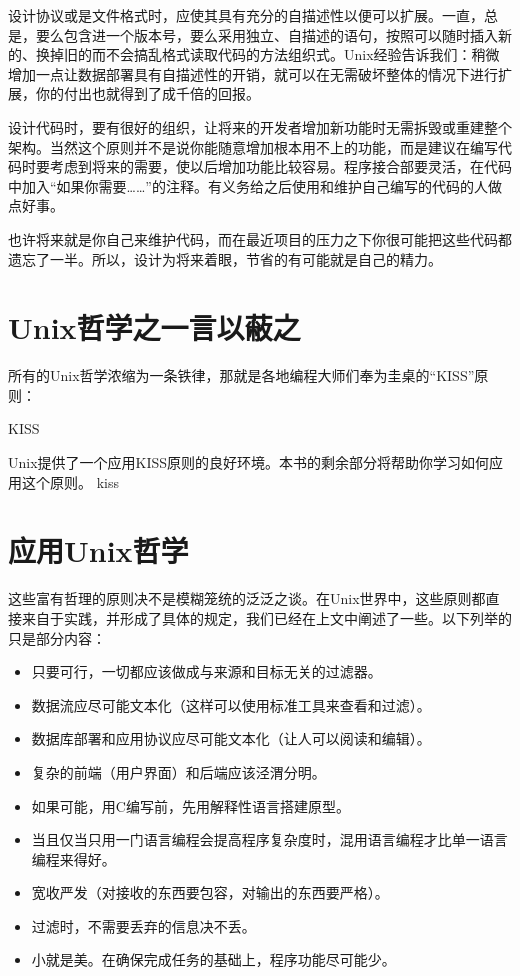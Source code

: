 \documentclass[11pt,oneside]{book}
\begin{document}
\begin{common-format}
设计协议或是文件格式时，应使其具有充分的自描述性以便可以扩展。一直，总是，要么包含进一个版本号，要么采用独立、自描述的语句，按照可以随时插入新的、换掉旧的而不会搞乱格式读取代码的方法组织式。Unix经验告诉我们：稍微增加一点让数据部署具有自描述性的开销，就可以在无需破坏整体的情况下进行扩展，你的付出也就得到了成千倍的回报。

设计代码时，要有很好的组织，让将来的开发者增加新功能时无需拆毁或重建整个架构。当然这个原则并不是说你能随意增加根本用不上的功能，而是建议在编写代码时要考虑到将来的需要，使以后增加功能比较容易。程序接合部要灵活，在代码中加入“如果你需要……”的注释。有义务给之后使用和维护自己编写的代码的人做点好事。

也许将来就是你自己来维护代码，而在最近项目的压力之下你很可能把这些代码都遗忘了一半。所以，设计为将来着眼，节省的有可能就是自己的精力。

\section{Unix哲学之一言以蔽之}
所有的Unix哲学浓缩为一条铁律，那就是各地编程大师们奉为圭桌的“KISS”原则：
\begin{linefig}{KISS}
\label{fig:KISS}
\end{linefig}

Unix提供了一个应用KISS原则的良好环境。本书的剩余部分将帮助你学习如何应用这个原则。
kiss
\section{应用Unix哲学}
这些富有哲理的原则决不是模糊笼统的泛泛之谈。在Unix世界中，这些原则都直接来自于实践，并形成了具体的规定，我们已经在上文中阐述了一些。以下列举的只是部分内容：
\begin{itemize}
\item 只要可行，一切都应该做成与来源和目标无关的过滤器。
\item 数据流应尽可能文本化（这样可以使用标准工具来查看和过滤）。
\item 数据库部署和应用协议应尽可能文本化（让人可以阅读和编辑）。
\item 复杂的前端（用户界面）和后端应该泾渭分明。
\item 如果可能，用C编写前，先用解释性语言搭建原型。
\item 当且仅当只用一门语言编程会提高程序复杂度时，混用语言编程才比单一语言编程来得好。
\item 宽收严发（对接收的东西要包容，对输出的东西要严格）。
\item 过滤时，不需要丢弃的信息决不丢。
\item 小就是美。在确保完成任务的基础上，程序功能尽可能少。
\end{itemize}


\end{common-format}
\end{document}
